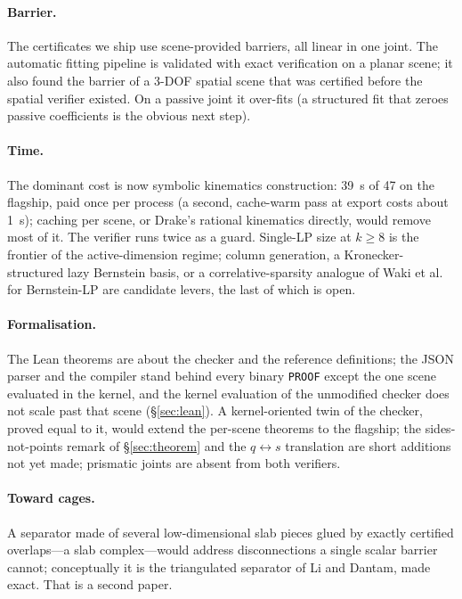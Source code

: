 \documentclass[10pt,twocolumn,letterpaper]{article}
\newif\ifhl \hlfalse  %
\newcommand{\new}[1]{\ifhl{\color{blue!65!black}#1}\else#1\fi}
\begin{document}
\paragraph{Barrier.} The certificates we ship use scene-provided barriers, all linear in one joint. The automatic fitting pipeline is validated with exact verification on a planar scene; it also found the barrier of a 3-DOF spatial scene that was certified before the spatial verifier existed. On a passive joint it over-fits (a structured fit that zeroes passive coefficients is the obvious next step).

\paragraph{Time.} The dominant cost is now symbolic kinematics construction: 39~s of 47 on the flagship, paid once per process (a second, cache-warm pass at export costs about 1~s); caching per scene, or Drake's rational kinematics directly, would remove most of it. The verifier runs twice as a guard. Single-LP size at $k\ge8$ is the frontier of the active-dimension regime; column generation, a Kronecker-structured lazy Bernstein basis, or a correlative-sparsity analogue of Waki et al.~\cite{waki2006} for Bernstein-LP are candidate levers, the last of which is open.

\paragraph{Formalisation.} \new{The Lean theorems are about the checker and the reference definitions; the JSON parser and the compiler stand behind every binary \texttt{PROOF} except the one scene evaluated in the kernel, and the kernel evaluation of the unmodified checker does not scale past that scene (\S\ref{sec:lean}). A kernel-oriented twin of the checker, proved equal to it, would extend the per-scene theorems to the flagship; the sides-not-points remark of \S\ref{sec:theorem} and the $q\leftrightarrow s$ translation are short additions not yet made; prismatic joints are absent from both verifiers.}

\paragraph{Toward cages.} A separator made of several low-dimensional slab pieces glued by exactly certified overlaps---a slab complex---would address disconnections a single scalar barrier cannot; conceptually it is the triangulated separator of Li and Dantam, made exact. That is a second paper.
\end{document}
